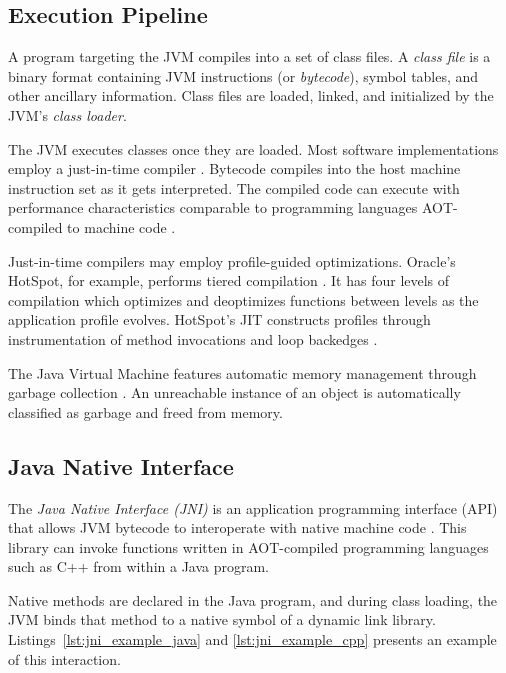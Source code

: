 \subsection{Execution Pipeline}

A program targeting the JVM compiles into a set of class files. A \textit{class file} is a binary format containing JVM instructions (or \emph{bytecode}), symbol tables, and other ancillary information. Class files are loaded, linked, and initialized by the JVM's \emph{class loader}.

The JVM executes classes once they are loaded. Most software implementations employ a just-in-time compiler \cite{kotzmann2008design}\nocite{paleczny2001java}. Bytecode compiles into the host machine instruction set as it gets interpreted. The compiled code can execute with performance characteristics comparable to programming languages AOT-compiled to machine code \cite{gherardi2012java,taboada2013java}.

Just-in-time compilers may employ profile-guided optimizations. Oracle's HotSpot, for example, performs tiered compilation \cite{java7tier}. It has four levels of compilation which optimizes and deoptimizes functions between levels as the application profile evolves. HotSpot's JIT constructs profiles through instrumentation of method invocations and loop backedges \cite{openjdktier}.

The Java Virtual Machine features automatic memory management through garbage collection \cite{pufek2019gc}. An unreachable instance of an object is automatically classified as garbage and freed from memory.

\subsection{Java Native Interface}

The \emph{Java Native Interface (JNI)} is an application programming interface (API) that allows JVM bytecode to interoperate with native machine code \cite{jni}. This library can invoke functions written in AOT-compiled programming languages such as C++ from within a Java program.

Native methods are declared in the Java program, and during class loading, the JVM binds that method to a native symbol of a dynamic link library. Listings~\ref{lst:jni_example_java} and \ref{lst:jni_example_cpp} presents an example of this interaction.

